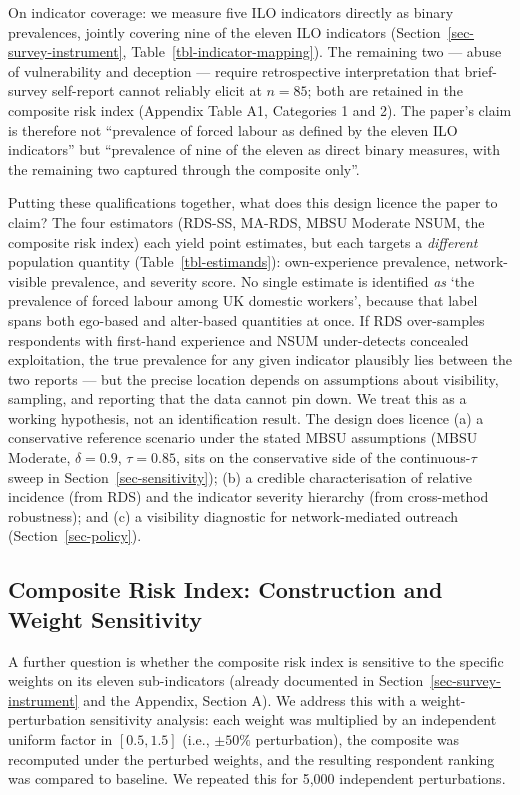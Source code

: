\documentclass[
  12pt,
  letterpaper,
  DIV=11,
  numbers=noendperiod]{scrartcl}
\begin{document}
On indicator coverage: we measure five ILO indicators directly as binary
prevalences, jointly covering nine of the eleven ILO indicators
(Section~\ref{sec-survey-instrument},
Table~\ref{tbl-indicator-mapping}). The remaining two --- abuse of
vulnerability and deception --- require retrospective interpretation
that brief-survey self-report cannot reliably elicit at \(n = 85\); both
are retained in the composite risk index (Appendix Table A1, Categories
1 and 2). The paper's claim is therefore not ``prevalence of forced
labour as defined by the eleven ILO indicators'' but ``prevalence of
nine of the eleven as direct binary measures, with the remaining two
captured through the composite only''.

Putting these qualifications together, what does this design licence the
paper to claim? The four estimators (RDS-SS, MA-RDS, MBSU Moderate NSUM,
the composite risk index) each yield point estimates, but each targets a
\emph{different} population quantity (Table~\ref{tbl-estimands}):
own-experience prevalence, network-visible prevalence, and severity
score. No single estimate is identified \emph{as} `the prevalence of
forced labour among UK domestic workers', because that label spans both
ego-based and alter-based quantities at once. If RDS over-samples
respondents with first-hand experience and NSUM under-detects concealed
exploitation, the true prevalence for any given indicator plausibly lies
between the two reports --- but the precise location depends on
assumptions about visibility, sampling, and reporting that the data
cannot pin down. We treat this as a working hypothesis, not an
identification result. The design does licence (a) a conservative
reference scenario under the stated MBSU assumptions (MBSU Moderate,
\(\delta = 0.9\), \(\tau = 0.85\), sits on the conservative side of the
continuous-\(\tau\) sweep in Section~\ref{sec-sensitivity}); (b) a
credible characterisation of relative incidence (from RDS) and the
indicator severity hierarchy (from cross-method robustness); and (c) a
visibility diagnostic for network-mediated outreach
(Section~\ref{sec-policy}).

\subsection{Composite Risk Index: Construction and Weight
Sensitivity}\label{sec-weights-sensitivity}

A further question is whether the composite risk index is sensitive to
the specific weights on its eleven sub-indicators (already documented in
Section~\ref{sec-survey-instrument} and the Appendix, Section A). We
address this with a weight-perturbation sensitivity analysis: each
weight was multiplied by an independent uniform factor in \([0.5, 1.5]\)
(i.e., \(\pm 50\%\) perturbation), the composite was recomputed under
the perturbed weights, and the resulting respondent ranking was compared
to baseline. We repeated this for 5,000 independent perturbations.
\end{document}
